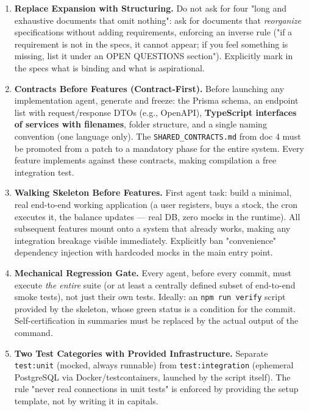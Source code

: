 \documentclass[11pt,a4paper]{article}
\newcommand{\file}[1]{\texttt{\small #1}}
\begin{document}
	\begin{enumerate}[leftmargin=1.8em]
		\item \textbf{Replace Expansion with Structuring.} Do not ask for four "long and exhaustive documents that omit nothing": ask for documents that \emph{reorganize} specifications without adding requirements, enforcing an inverse rule ("if a requirement is not in the specs, it cannot appear; if you feel something is missing, list it under an OPEN QUESTIONS section"). Explicitly mark in the specs what is binding and what is aspirational.
		
		\item \textbf{Contracts Before Features (Contract-First).} Before launching any implementation agent, generate and freeze: the Prisma schema, an endpoint list with request/response DTOs (e.g., OpenAPI), \textbf{TypeScript interfaces of services with filenames}, folder structure, and a single naming convention (one language only). The \file{SHARED\_CONTRACTS.md} from doc 4 must be promoted from a patch to a mandatory phase for the entire system. Every feature implements against these contracts, making compilation a free integration test.
		
		\item \textbf{Walking Skeleton Before Features.} First agent task: build a minimal, real end-to-end working application (a user registers, buys a stock, the cron executes it, the balance updates --- real DB, zero mocks in the runtime). All subsequent features mount onto a system that already works, making any integration breakage visible immediately. Explicitly ban "convenience" dependency injection with hardcoded mocks in the main entry point.
		
		\item \textbf{Mechanical Regression Gate.} Every agent, before every commit, must execute \emph{the entire} suite (or at least a centrally defined subset of end-to-end smoke tests), not just their own tests. Ideally: an \file{npm run verify} script provided by the skeleton, whose green status is a condition for the commit. Self-certification in summaries must be replaced by the actual output of the command.
		
		\item \textbf{Two Test Categories with Provided Infrastructure.} Separate \file{test:unit} (mocked, always runnable) from \file{test:integration} (ephemeral PostgreSQL via Docker/testcontainers, launched by the script itself). The rule "never real connections in unit tests" is enforced by providing the setup template, not by writing it in capitals.
		

\end{enumerate}
\end{document}
